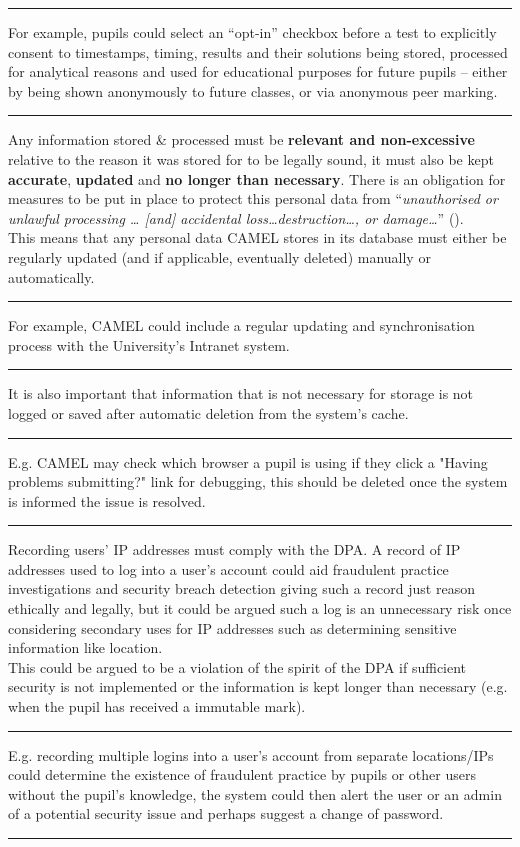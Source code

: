\vspace{0.35cm} \hrule {\raggedleft \scriptsize For example, pupils could select an “opt-in” checkbox before a test to explicitly consent to timestamps, timing, results and their solutions being stored, processed for analytical reasons and used for educational purposes for future pupils -- either by being shown anonymously  to future classes, or via anonymous peer marking.\par} \vspace{0.35cm} \hrule
Any information stored \& processed must be \textbf{relevant and non-excessive} relative to the reason it was stored for to be legally sound, it must also be kept \textbf{accurate}, \textbf{updated} and \textbf{no longer than necessary}. There is an obligation for measures to be put in place to protect this personal data from “\textit{unauthorised or unlawful processing … [and] accidental loss\ldots destruction\ldots, or damage\ldots}” (\cite{DPA:tDPP:S1}).
\\This means that any personal data CAMEL stores in its database must either be regularly updated (and if applicable, eventually deleted) manually or automatically.
\vspace{0.35cm} \hrule {\raggedleft \scriptsize For example, CAMEL could include a regular updating and synchronisation process with the University's Intranet system. \par} \vspace{0.35cm} \hrule
It is also important that information that is not necessary for storage is not logged or saved after automatic deletion from the system’s cache.
\vspace{0.35cm} \hrule {\raggedleft \scriptsize E.g. CAMEL may check which browser a pupil is using if they click a "Having problems submitting?" link for debugging, this should be deleted once the system is informed the issue is resolved. \par} \vspace{0.35cm} \hrule
Recording users' IP addresses must comply with the DPA. A record of IP addresses used to log into a user's account could aid fraudulent practice investigations and security breach detection giving such a record just reason ethically and legally, but it could be argued such a log is an unnecessary risk once considering secondary uses for IP addresses such as determining sensitive information like location.
\\This could be argued to be a violation of the spirit of the DPA if sufficient security is not implemented or the information is kept longer than necessary (e.g. when the pupil has received a immutable mark).
\vspace{0.35cm} \hrule {\raggedleft \scriptsize E.g. recording multiple logins into a user’s account from separate locations/IPs could determine the existence of fraudulent practice by pupils or other users without the pupil’s knowledge, the system could then alert the user or an admin of a potential security issue and perhaps suggest a change of password.\par} \vspace{0.35cm} \hrule
{}
